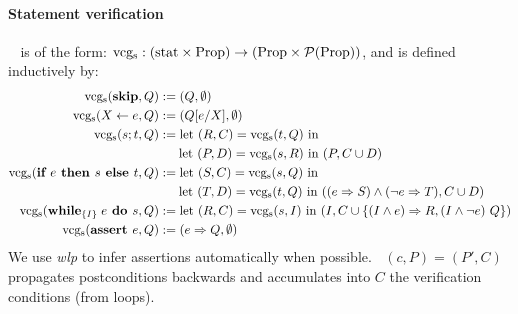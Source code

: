 \documentclass[toc]{../cs-classes/cs-classes}
\DeclareMathOperator{\vcgs}{vcg_s}
\begin{document}
\paragraph*{Statement verification} 
$\vcgs$ is of the form: $\vcgs:(\textnormal{stat}\times\textnormal{Prop}) \rightarrow (\textnormal{Prop}\times\mathcal{P}(\textnormal{Prop}))$, and is defined inductively by:
\begin{equation*}
    \begin{aligned}
        \vcgs(\textnormal{\bf skip}, Q) &:= (Q, \emptyset)\\
        \vcgs(X\leftarrow e, Q) &:= (Q[e/X], \emptyset)\\
        \vcgs(s; t, Q) &:= \textnormal{let } (R, C) = \vcgs(t, Q)\textnormal{ in}\\ 
        &\;\;\quad\textnormal{let } (P, D) = \vcgs(s, R) \textnormal{ in } (P, C\cup D)\\
        \vcgs(\textnormal{\bf if } e \textnormal{\textbf{ then }} s \textnormal{\textbf{ else }} t, Q) &:= \textnormal{let } (S, C) = \vcgs(s, Q)\textnormal{ in}\\ 
        &\;\;\quad\textnormal{let } (T, D) = \vcgs(t, Q) \textnormal{ in } ((e\Rightarrow S) \land (\lnot e\Rightarrow T), C\cup D)\\
        \vcgs(\textnormal{\bf while}_{\{I\}} \; e \textnormal{\textbf{ do }} s, Q) &:= \textnormal{let } (R, C) = \vcgs(s, I)\textnormal{ in } (I, C\cup\{(I\land e) \Rightarrow R, (I\land \lnot e) \ Q\})\\
        \vcgs(\textbf{\bf assert } e, Q) &:= (e\Rightarrow Q, \emptyset)
    \end{aligned}
\end{equation*}
We use \emph{wlp} to infer assertions automatically when possible. $\vcgs(c, P)=(P', C)$ propagates postconditions backwards and accumulates into $C$ the verification conditions (from loops).
\end{document}
